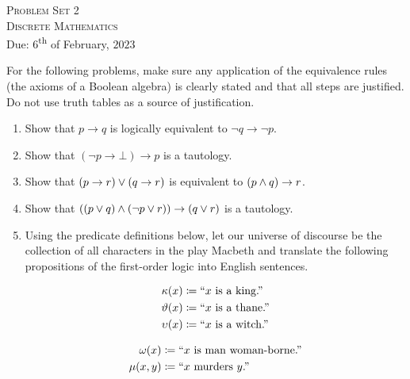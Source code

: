




\begin{center}
    \textsc{\huge Problem Set 2}\\
    \textsc{\large Discrete Mathematics}\\
    {\color{gruvred}Due: \(6\)\textsuperscript{th} of February, \(2023\)}
\end{center}

For the following problems, make sure any application of the equivalence rules
(the axioms of a Boolean algebra) is clearly stated and that all steps are justified.
Do not use truth tables as a source of justification.
\begin{enumerate}
    \item
        Show that \(p \rightarrow q\) is logically equivalent to \(\neg q \rightarrow \neg p\).
    \item
        Show that \((\neg p \rightarrow \bot)  \rightarrow p\) is a tautology.
    \item
        Show that \((p \rightarrow r) \vee (q \rightarrow r)\) is equivalent to \((p \wedge q) \rightarrow r\).
    \item
        Show that \(\pn*{(p \join q) \meet (\neg p \join r)} \rightarrow (q \join r)\) is a tautology.
    \item
        Using the predicate definitions below,
        let our universe of discourse be the collection of all characters in the play Macbeth
        and translate the following propositions of the first-order logic into English sentences.\\
        \begin{minipage}{.5\linewidth}
            \begin{align*}
                \kappa(x) &\coloneqq \text{``}x\text{ is a king.''}\\
                \vartheta(x) &\coloneqq \text{``}x\text{ is a thane.''}\\
                \upsilon(x) &\coloneqq \text{``}x\text{ is a witch.''}
            \end{align*}
        \end{minipage}%
        \begin{minipage}{.5\linewidth}
            \begin{align*}
                \omega(x) &\coloneqq \text{``}x\text{ is man woman-borne.''}\\
                \mu(x, y) &\coloneqq \text{``}x\text{ murders }y\text{.''}
            \end{align*}

\end{minipage}
\end{enumerate}
